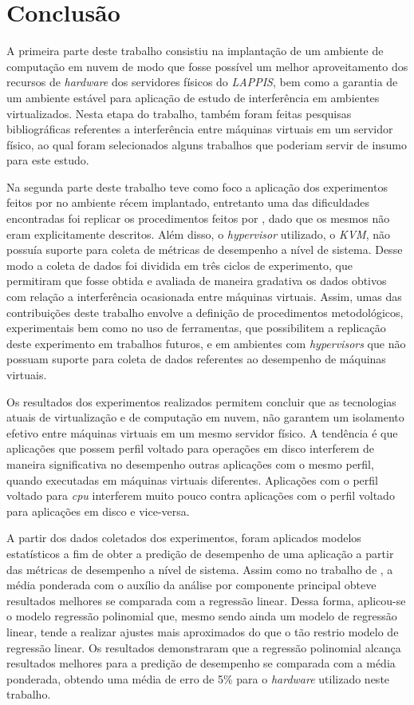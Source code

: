 \chapter{Conclusão}
\label{cap:conclusao}

A primeira parte deste trabalho consistiu na implantação de um ambiente de computação em nuvem de modo que fosse possível um melhor aproveitamento dos recursos de \textit{hardware} dos servidores físicos do \textit{LAPPIS}, bem como a garantia de um ambiente estável para aplicação de estudo de interferência em ambientes virtualizados. Nesta etapa do trabalho, também foram feitas pesquisas bibliográficas referentes a interferência entre máquinas virtuais em um servidor físico, ao qual foram selecionados alguns trabalhos que poderiam servir de insumo para este estudo.

Na segunda parte deste trabalho teve como foco a aplicação dos experimentos feitos por  no ambiente récem implantado, entretanto uma das dificuldades encontradas foi replicar os procedimentos feitos por , dado que os mesmos não eram explicitamente descritos. Além disso, o \textit{hypervisor} utilizado, o \textit{KVM}, não possuía suporte para coleta de métricas de desempenho a nível de sistema. Desse modo a coleta de dados foi dividida em três ciclos de experimento, que permitiram que fosse obtida e avaliada de maneira gradativa os dados obtivos com relação a interferência ocasionada entre máquinas virtuais. Assim, umas das contribuições deste trabalho envolve a definição de procedimentos metodológicos, experimentais bem como no uso de ferramentas, que possibilitem a replicação deste experimento em trabalhos futuros, e em ambientes com \textit{hypervisors} que não possuam suporte para coleta de dados referentes ao desempenho de máquinas virtuais.  %

Os resultados dos experimentos realizados permitem concluir que as tecnologias atuais de virtualização e de computação em nuvem, não garantem um isolamento efetivo entre máquinas virtuais em um mesmo servidor físico. A tendência é que aplicações que possem perfil voltado para operações em disco interferem de maneira significativa no desempenho outras aplicações  com o mesmo perfil, quando executadas em máquinas virtuais diferentes. Aplicações com o perfil voltado para \textit{cpu} interferem muito pouco contra aplicações com o perfil voltado para aplicações em disco e vice-versa.

A partir dos dados coletados dos experimentos, foram aplicados modelos estatísticos a fim de obter a predição de desempenho de uma aplicação a partir das métricas de desempenho a nível de sistema. Assim como no trabalho de , a média ponderada com o auxílio da análise por componente principal obteve resultados melhores se comparada com a regressão linear. Dessa forma, aplicou-se o modelo regressão polinomial que, mesmo sendo ainda um modelo de regressão linear, tende a realizar ajustes mais aproximados do que o tão restrio modelo de regressão linear. Os resultados demonstraram que a regressão polinomial alcança resultados melhores para a predição de desempenho se comparada com a média ponderada, obtendo uma média de erro de 5\% para o \textit{hardware} utilizado neste trabalho.

